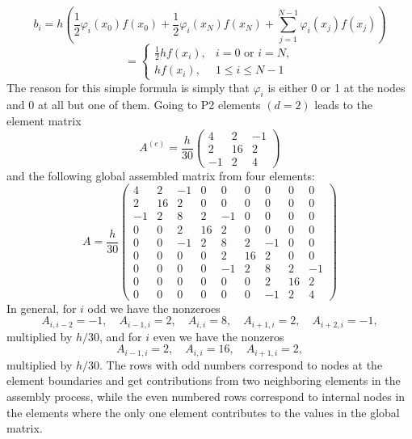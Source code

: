 \documentclass[../main.tex]{subfiles}
\begin{document}
	\begin{equation}\label{eqa80}
		b_{i} =h\left(\frac{1}{2} \varphi_{i}\left(x_{0}\right) f\left(x_{0}\right)+\frac{1}{2} \varphi_{i}\left(x_{N}\right) f\left(x_{N}\right)+\sum_{j=1}^{N-1} \varphi_{i}\left(x_{j}\right) f\left(x_{j}\right)\right)
	\end{equation}
	\begin{equation}\label{eqa81}
		= \begin{cases}\frac{1}{2} h f\left(x_{i}\right), & i=0 \text { or } i=N, \\
			h f\left(x_{i}\right), & 1 \leq i \leq N-1\end{cases}
	\end{equation}
	The reason for this simple formula is simply that $\varphi_{i}$ is either 0 or 1 at the nodes and 0 at all but one of them.
	Going to P2 elements $(d=2)$ leads to the element matrix
	\begin{equation}\label{eqa82}
		A^{(e)}=\frac{h}{30}\left(\begin{array}{ccc}
			4 & 2 & -1 \\
			2 & 16 & 2 \\
			-1 & 2 & 4
		\end{array}\right)
	\end{equation}
	and the following global assembled matrix from four elements:
	\begin{equation}\label{eqa83}
		A=\frac{h}{30}\left(\begin{array}{ccccccccc}
			4 & 2 & -1 & 0 & 0 & 0 & 0 & 0 & 0 \\
			2 & 16 & 2 & 0 & 0 & 0 & 0 & 0 & 0 \\
			-1 & 2 & 8 & 2 & -1 & 0 & 0 & 0 & 0 \\
			0 & 0 & 2 & 16 & 2 & 0 & 0 & 0 & 0 \\
			0 & 0 & -1 & 2 & 8 & 2 & -1 & 0 & 0 \\
			0 & 0 & 0 & 0 & 2 & 16 & 2 & 0 & 0 \\
			0 & 0 & 0 & 0 & -1 & 2 & 8 & 2 & -1 \\
			0 & 0 & 0 & 0 & 0 & 0 & 2 & 16 & 2 \\
			0 & 0 & 0 & 0 & 0 & 0 & -1 & 2 & 4
		\end{array}\right)
	\end{equation}
	In general, for $i$ odd we have the nonzeroes
	$$
	A_{i, i-2}=-1, \quad A_{i-1, i}=2, \quad A_{i, i}=8, \quad A_{i+1, i}=2, \quad A_{i+2, i}=-1,
	$$
	multiplied by $h / 30$, and for $i$ even we have the nonzeros
	$$
	A_{i-1, i}=2, \quad A_{i, i}=16, \quad A_{i+1, i}=2,
	$$
	multiplied by $h / 30$. The rows with odd numbers correspond to nodes at the element boundaries and get contributions from two neighboring elements in the assembly process, while the even numbered rows correspond to internal nodes in the elements where the only one element contributes to the values in the global matrix.
\end{document}
